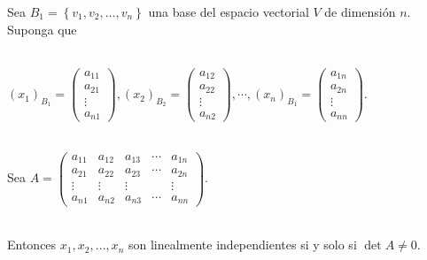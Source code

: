 \begin{thm}
Sea $B_1 = \left\{ v_1,v_2, \dots, v_n \right\}$ una base del espacio vectorial $V$ de dimensión $n$. Suponga que 
\\\

$(x_1)_{B_1} = \begin{pmatrix} a_{11} \\ a_{21} \\ \vdots \\ a_{n1} \end{pmatrix}, (x_2)_{B_2} = \begin{pmatrix} a_{12} \\ a_{22} \\ \vdots \\ a_{n2} \end{pmatrix}, \cdots , (x_n)_{B_1} = \begin{pmatrix} a_{1n} \\ a_{2n} \\ \vdots \\ a_{nn} \end{pmatrix}$.
\\\

Sea $A = \begin{pmatrix} a_{11} & a_{12} & a_{13} & \cdots & a_{1n} \\ a_{21} & a_{22} & a_{23} & \cdots & a_{2n} \\ \vdots & \vdots & \vdots & & \vdots \\ a_{n1} & a_{n2} & a_{n3} & \cdots & a_{nn} \end{pmatrix}$.
\\\

Entonces $x_1, x_2, \dots, x_n$ son linealmente independientes si y solo si $\det A \not= 0$.
\end{thm}





